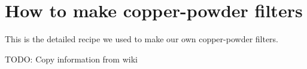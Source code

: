 \chapter{How to make copper-powder filters}
\label{app:copperpowder}

This is the detailed recipe we used to make our own copper-powder filters.

TODO: Copy information from wiki


